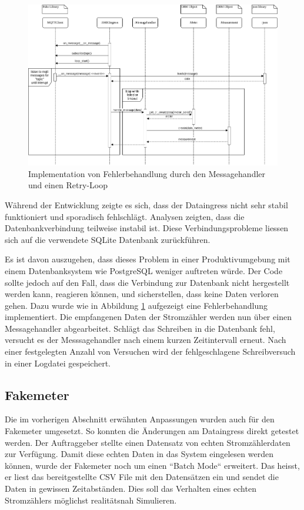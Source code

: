 \begin{figure}[H]
    \centering
    \includegraphics[width=1.0\textwidth]{gfx/dataingress-sequence}
    \caption{
        Implementation von Fehlerbehandlung durch den Messagehandler und einen
        Retry-Loop
    }
    \label{fig:dataingress-sequence}
\end{figure}

Während der Entwicklung zeigte es sich, dass der Dataingress nicht sehr stabil
funktioniert und sporadisch fehlschlägt. Analysen zeigten, dass
die Datenbankverbindung teilweise instabil ist.
Diese Verbindungsprobleme liessen sich auf die verwendete SQLite Datenbank zurückführen.

Es ist davon auszugehen, dass dieses Problem in einer Produktivumgebung mit einem Datenbanksystem wie PostgreSQL
weniger auftreten würde.
Der Code sollte jedoch auf den Fall, dass die Verbindung zur Datenbank nicht hergestellt werden kann, reagieren können,
und sicherstellen, dass keine Daten verloren gehen.
Dazu wurde wie in Abbildung \ref{fig:dataingress-sequence} aufgezeigt
eine Fehlerbehandlung implementiert.
Die empfangenen Daten der Stromzähler
werden nun über einen Messagehandler abgearbeitet.
Schlägt das Schreiben in die Datenbank fehl, versucht es der Messsagehandler nach einem kurzen Zeitintervall erneut.
Nach einer festgelegten Anzahl von Versuchen wird der fehlgeschlagene Schreibversuch in einer Logdatei gespeichert.

\subsection{Fakemeter}
Die im vorherigen Abschnitt erwähnten Anpassungen wurden auch für den Fakemeter umgesetzt.
So konnten die Änderungen am Dataingress direkt getestet werden. 
Der Auftraggeber stellte einen Datensatz von echten Stromzählerdaten
zur Verfügung. Damit diese echten Daten in das System eingelesen werden können,
wurde der Fakemeter noch um einen ``Batch Mode`` erweitert. Das heisst,
er liest das bereitgestellte CSV File mit den Datensätzen ein und sendet die Daten in
gewissen Zeitabständen. Dies soll das Verhalten eines echten Stromzählers
möglichst realitätsnah Simulieren. 

